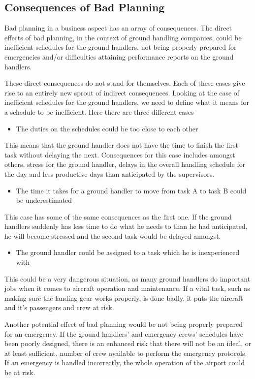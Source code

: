 \subsection{Consequences of Bad Planning}
Bad planning in a business aspect has an array of consequences. The direct effects of bad planning, in the context of ground handling companies, could be inefficient schedules for the ground handlers, not being properly prepared for emergencies and/or difficulties attaining performance reports on the ground handlers.

These direct consequences do not stand for themselves. Each of these cases give rise to an entirely new sprout of indirect consequences.
Looking at the case of inefficient schedules for the ground handlers, we need to define what it means for a schedule to be inefficient. Here there are three different cases
\begin{itemize}
	\item The duties on the schedules could be too close to each other
\end{itemize}
This means that the ground handler does not have the time to finish the first task without delaying the next. Consequences for this case includes amongst others, stress for the ground handler, delays in the overall handling schedule for the day and less productive days than anticipated by the supervisors.
\begin{itemize}
	\item The time it takes for a ground handler to move from task A to task B could be underestimated
\end{itemize}
This case has some of the same consequences as the first one. If the ground handlers suddenly has less time to do what he needs to than he had anticipated, he will become stressed and the second task would be delayed amongst.
\begin{itemize}
	\item The ground handler could be assigned to a task which he is inexperienced with
\end{itemize}
This could be a very dangerous situation, as many ground handlers do important jobs when it comes to aircraft operation and maintenance. If a vital task, such as making sure the landing gear works properly, is done badly, it puts the aircraft and it's passengers and crew at risk.


Another potential effect of bad planning would be not being properly prepared for an emergency. If the ground handlers' and emergency crews' schedules have been poorly designed, there is an enhanced risk that there will not be an ideal, or at least sufficient, number of crew available to perform the emergency protocols. If an emergency is handled incorrectly, the whole operation of the airport could be at risk.



